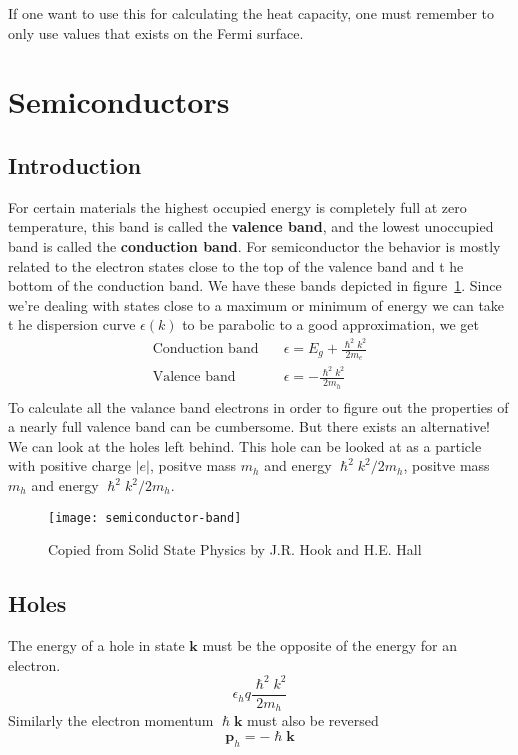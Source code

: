 \documentclass[11pt]{article}
\begin{document}
If one want to use this for calculating the heat capacity, one must remember to only use values that exists on the Fermi surface.

\newpage
\section{Semiconductors}
\subsection{Introduction}
For certain materials the highest occupied energy is completely full at zero temperature, this band is called the \textbf{valence band}, and the lowest unoccupied band is called the \textbf{conduction band}. For semiconductor the behavior is mostly related to the electron states close to the top of the valence band and t he bottom of the conduction band. We have these bands depicted in figure~\ref{fig:semiconductor-band}. Since we're dealing with states close to a maximum or minimum of energy we can take t he dispersion curve $\epsilon(k)$ to be parabolic to a good approximation, we get
\begin{align}
	\text{Conduction band} \quad &\epsilon = E_g + \frac{\hslash^2 k^2}{2m_e} \\
	\text{Valence band} \quad &\epsilon = - \frac{\hslash^2 k^2}{2m_h} \\
\end{align}
To calculate all the valance band electrons in order to figure out the properties of a nearly full valence band can be cumbersome. But there exists an alternative! We can look at the holes left behind. This hole can be looked at as a particle with positive charge $|e|$, positve mass $m_h$ and energy $\hslash^2 k^2/2m_h$, positve mass $m_h$ and energy $\hslash^2 k^2/2m_h$.
\begin{figure}[!ht]
	\centering
	\texttt{[image: semiconductor-band]}
	\caption{Copied from Solid State Physics by J.R. Hook and H.E. Hall}
	\label{fig:semiconductor-band}
\end{figure}
\subsection{Holes}
The energy of a hole in state $\pmb{k}$ must be the opposite of the energy for an electron.
\begin{equation}
	\epsilon_h q \frac{\hslash^2 k^2}{2m_h}
\end{equation}
Similarly the electron momentum $\hslash \pmb{k}$ must also be reversed
\begin{equation}
	\pmb{p}_h = -\hslash \pmb{k}
\end{equation}
\end{document}
